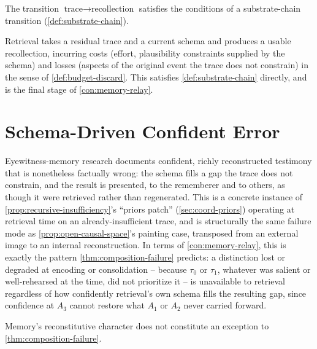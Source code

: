 \begin{proposition}
\label{prop:memory-relay}
The transition $\text{trace} \to \text{recollection}$ satisfies the
conditions of a substrate-chain transition (\cref{def:substrate-chain}).
\end{proposition}

\begin{proofsketch}
Retrieval takes a residual trace and a current schema and produces a
usable recollection, incurring costs (effort, plausibility constraints
supplied by the schema) and losses (aspects of the original event the
trace does not constrain) in the sense of \cref{def:budget-discard}. This
satisfies \cref{def:substrate-chain} directly, and is the final stage of
\cref{con:memory-relay}.
\end{proofsketch}

\section{Schema-Driven Confident Error}

Eyewitness-memory research documents confident, richly reconstructed
testimony that is nonetheless factually wrong: the schema fills a gap the
trace does not constrain, and the result is presented, to the rememberer
and to others, as though it were retrieved rather than regenerated. This
is a concrete instance of \cref{prop:recursive-insufficiency}'s ``priors
patch'' (\cref{sec:coord-priors}) operating at retrieval time on an
already-insufficient trace, and is structurally the same failure mode as
\cref{prop:open-causal-space}'s painting case, transposed from an
external image to an internal reconstruction. In terms of
\cref{con:memory-relay}, this is exactly the pattern
\cref{thm:composition-failure} predicts: a distinction lost or degraded
at encoding or consolidation -- because $\tau_0$ or $\tau_1$, whatever
was salient or well-rehearsed at the time, did not prioritize it -- is
unavailable to retrieval regardless of how confidently retrieval's own
schema fills the resulting gap, since confidence at $A_3$ cannot restore
what $A_1$ or $A_2$ never carried forward.

\begin{proposition}
\label{prop:memory-no-escape}
Memory's reconstitutive character does not constitute an exception to
\cref{thm:composition-failure}.
\end{proposition}

